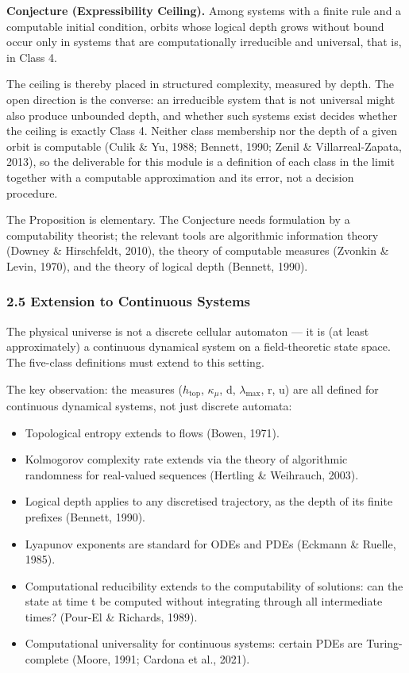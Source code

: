 \documentclass[
]{article}
\providecommand{\tightlist}{%
  \setlength{\itemsep}{0pt}\setlength{\parskip}{0pt}}
\begin{document}
\textbf{Conjecture (Expressibility Ceiling).} Among systems with a
finite rule and a computable initial condition, orbits whose logical
depth grows without bound occur only in systems that are computationally
irreducible and universal, that is, in Class 4.

The ceiling is thereby placed in structured complexity, measured by
depth. The open direction is the converse: an irreducible system that is
not universal might also produce unbounded depth, and whether such
systems exist decides whether the ceiling is exactly Class 4. Neither
class membership nor the depth of a given orbit is computable (Culik \&
Yu, 1988; Bennett, 1990; Zenil \& Villarreal-Zapata, 2013), so the
deliverable for this module is a definition of each class in the limit
together with a computable approximation and its error, not a decision
procedure.

The Proposition is elementary. The Conjecture needs formulation by a
computability theorist; the relevant tools are algorithmic information
theory (Downey \& Hirschfeldt, 2010), the theory of computable measures
(Zvonkin \& Levin, 1970), and the theory of logical depth (Bennett,
1990).

\hypertarget{extension-to-continuous-systems}{%
\subsubsection{2.5 Extension to Continuous
Systems}\label{extension-to-continuous-systems}}

The physical universe is not a discrete cellular automaton --- it is (at
least approximately) a continuous dynamical system on a field-theoretic
state space. The five-class definitions must extend to this setting.

The key observation: the measures (\(h_{\mathrm{top}}\),
\(\kappa_{\mu}\), d, \(\lambda_{\max}\), r, u) are all defined for
continuous dynamical systems, not just discrete automata:

\begin{itemize}
\tightlist
\item
  Topological entropy extends to flows (Bowen, 1971).
\item
  Kolmogorov complexity rate extends via the theory of algorithmic
  randomness for real-valued sequences (Hertling \& Weihrauch, 2003).
\item
  Logical depth applies to any discretised trajectory, as the depth of
  its finite prefixes (Bennett, 1990).
\item
  Lyapunov exponents are standard for ODEs and PDEs (Eckmann \& Ruelle,
  1985).
\item
  Computational reducibility extends to the computability of solutions:
  can the state at time t be computed without integrating through all
  intermediate times? (Pour-El \& Richards, 1989).
\item
  Computational universality for continuous systems: certain PDEs are
  Turing-complete (Moore, 1991; Cardona et al., 2021).
\end{itemize}
\end{document}
